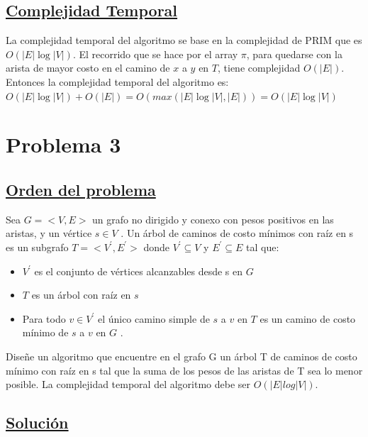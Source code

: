 \documentclass{article}
\begin{document}
    \subsection{\underline{Complejidad Temporal}}
    La complejidad temporal del algoritmo se base en la complejidad de PRIM que es $O(|E|\log{|V|})$. El recorrido 
    que se hace por el array $\pi$, para quedarse con la arista de mayor costo en el camino de $x$ a $y$ en $T$, tiene complejidad $ O(|E|)$. 
    Entonces la complejidad temporal del algoritmo es:\\ $O(|E|\log{|V|}) + O(|E|) = O(max(|E|\log{|V|}, |E|)) = O(|E|\log{|V|})$

    \newpage 


    \section{Problema 3} 

    \subsection{\underline{Orden del problema}} 

    Sea $G = <V,E>$ un grafo no dirigido y conexo con pesos positivos en las aristas, y un v\'ertice $s \in V$ . Un \'arbol de 
    caminos de costo m\'inimos con ra\'iz en s es un subgrafo $T = <V^{'} , E^{'}> $ donde $V^{'} \subseteq  V $     y $E^{'} \subseteq  E $ tal que: 
    
    \begin{itemize}
        \item $V^{'}$ es el conjunto de v\'ertices alcanzables desde s en $G$
        \item $T$ es un \'arbol con ra\'iz en $s$
        \item Para todo $v \in V^{'}$ el \'unico camino simple de $s$ a $v$ en $T$ es un camino de costo m\'inimo de $s$ a $v$ en $G$ .
    \end{itemize}

    \noindent Dise\~ne un algoritmo que encuentre en el grafo G un \'arbol T de caminos de costo m\'inimo con ra\'iz en s tal que
    la suma de los pesos de las aristas de T sea lo menor posible. La complejidad temporal del algoritmo debe ser
    $O(|E|log|V|)$.


    \subsection{\underline{Soluci\'on }}
\end{document}
